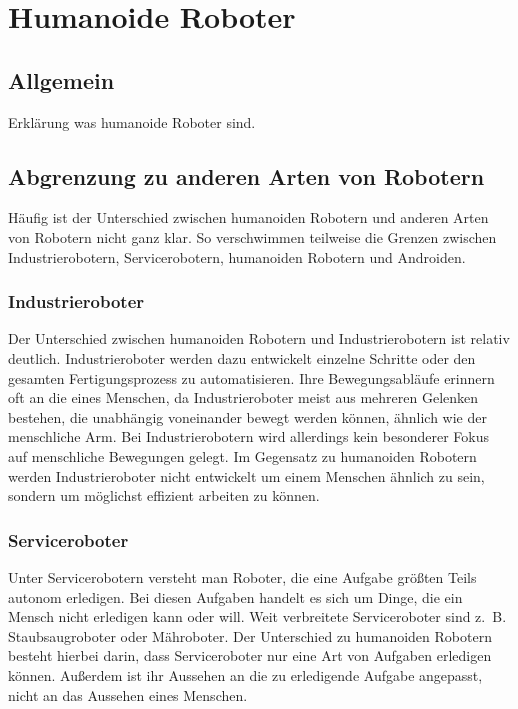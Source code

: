 \chapter{Humanoide Roboter}\label{sec:humanoide-roboter}
\section{Allgemein}\label{sec:allgemein}
Erklärung was humanoide Roboter sind.

\section{Abgrenzung zu anderen Arten von Robotern}\label{sec:abgrenzung}
Häufig ist der Unterschied zwischen humanoiden Robotern und anderen Arten von
Robotern nicht ganz klar. So verschwimmen teilweise die Grenzen zwischen
Industrierobotern, Servicerobotern, humanoiden Robotern und Androiden.

\subsection{Industrieroboter}\label{sec:industrieroboter}
Der Unterschied zwischen humanoiden Robotern und Industrierobotern ist relativ
deutlich. Industrieroboter werden dazu entwickelt einzelne Schritte oder den
gesamten Fertigungsprozess zu automatisieren. Ihre Bewegungsabläufe erinnern oft
an die eines Menschen, da Industrieroboter meist aus mehreren Gelenken bestehen,
die unabhängig voneinander bewegt werden können, ähnlich wie der menschliche
Arm. \cite{Weber2017} Bei Industrierobotern wird allerdings kein besonderer
Fokus auf menschliche Bewegungen gelegt. Im Gegensatz zu humanoiden Robotern
werden Industrieroboter nicht entwickelt um einem Menschen ähnlich zu sein,
sondern um möglichst effizient arbeiten zu können.

\subsection{Serviceroboter}\label{sec:serviceroboter}
Unter Servicerobotern versteht man Roboter, die eine Aufgabe größten Teils
autonom erledigen. Bei diesen Aufgaben handelt es sich um Dinge, die ein Mensch
nicht erledigen kann oder will. Weit verbreitete Serviceroboter sind z.~B.
Staubsaugroboter oder Mähroboter. Der Unterschied zu humanoiden Robotern besteht
hierbei darin, dass Serviceroboter nur eine Art von Aufgaben erledigen können.
Außerdem ist ihr Aussehen an die zu erledigende Aufgabe angepasst, nicht an das
Aussehen eines Menschen.

